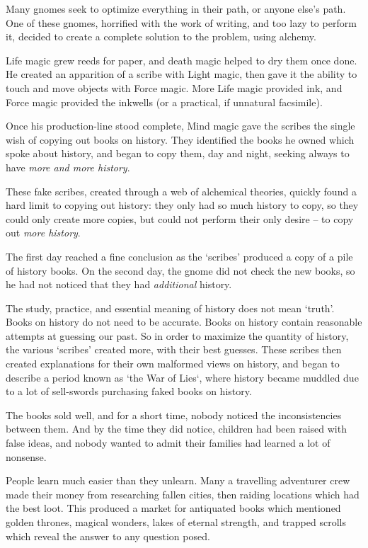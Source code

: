 \begin{multicols}{2}
\begin{exampletext}
  Many gnomes seek to optimize everything in their path, or anyone else's path.
  One of these gnomes, horrified with the work of writing, and too lazy to perform it, decided to create a complete solution to the problem, using alchemy.

  Life magic grew reeds for paper, and death magic helped to dry them once done.
  He created an apparition of a scribe with Light magic, then gave it the ability to touch and move objects with Force magic.
  More Life magic provided ink, and Force magic provided the inkwells (or a practical, if unnatural facsimile).

  Once his production-line stood complete, Mind magic gave the scribes the single wish of copying out books on history.
  They identified the books he owned which spoke about history, and began to copy them, day and night, seeking always to have \emph{more and more history}.

  These fake scribes, created through a web of alchemical theories, quickly found a hard limit to copying out history: they only had so much history to copy, so they could only create more copies, but could not perform their only desire -- to copy out \emph{more history}.

  The first day reached a fine conclusion as the `scribes' produced a copy of a pile of history books.
  On the second day, the gnome did not check the new books, so he had not noticed that they had \emph{additional} history.

  The study, practice, and essential meaning of history does not mean `truth'.
  Books on history do not need to be accurate.
  Books on history contain reasonable attempts at guessing our past.
  So in order to maximize the quantity of history, the various `scribes' created more, with their best guesses.
  These scribes then created explanations for their own malformed views on history, and began to describe a period known as `the War of Lies`, where history became muddled due to a lot of sell-swords purchasing faked books on history.

  The books sold well, and for a short time, nobody noticed the inconsistencies between them.
  And by the time they did notice, children had been raised with false ideas, and nobody wanted to admit their families had learned a lot of nonsense.

  People learn much easier than they unlearn.
  \else
    Many a travelling adventurer crew made their money from researching fallen cities, then raiding locations which had the best loot.
    This produced a market for antiquated books which mentioned golden thrones, magical wonders, lakes of eternal strength, and trapped scrolls which reveal the answer to any question posed.


\end{exampletext}
\end{multicols}
